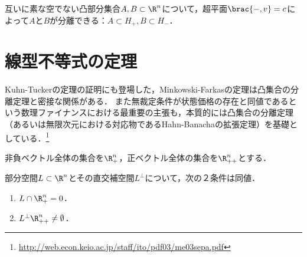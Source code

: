\documentclass[uplatex,dvipdfmx]{jsreport}
\begin{document}
\begin{theorem}[分離定理]
    互いに素な空でない凸部分集合$A,B\subset\R^n$について，超平面$\brac{-,v}=c$によって$A$と$B$が分離できる：$A\subset H_+,B\subset H_-$．
\end{theorem}

\section{線型不等式の定理}

\begin{tcolorbox}[colframe=ForestGreen, colback=ForestGreen!10!white,breakable,colbacktitle=ForestGreen!40!white,coltitle=black,fonttitle=\bfseries\sffamily,
title=]
    Kuhn-Tuckerの定理の証明にも登場した，Minkowski-Farkasの定理は凸集合の分離定理と密接な関係がある．
    また無裁定条件が状態価格の存在と同値であるという数理ファイナンスにおける最重要の主張も，本質的には凸集合の分離定理（あるいは無限次元における対応物であるHahn-Banachaの拡張定理）を基礎としている．\footnote{\url{http://web.econ.keio.ac.jp/staff/ito/pdf03/me03sepa.pdf}}
\end{tcolorbox}

\begin{notation}
    非負ベクトル全体の集合を$\R^n_+$，正ベクトル全体の集合を$\R^n_{++}$とする．
\end{notation}

\begin{lemma}
    部分空間$L\subset\R^n$とその直交補空間$L^\perp$について，次の２条件は同値．
    \begin{enumerate}
        \item $L\cap\R^n_+=0$．
        \item $L^\perp\R^n_{++}\ne\emptyset$．
    \end{enumerate}
\end{lemma}
\end{document}
